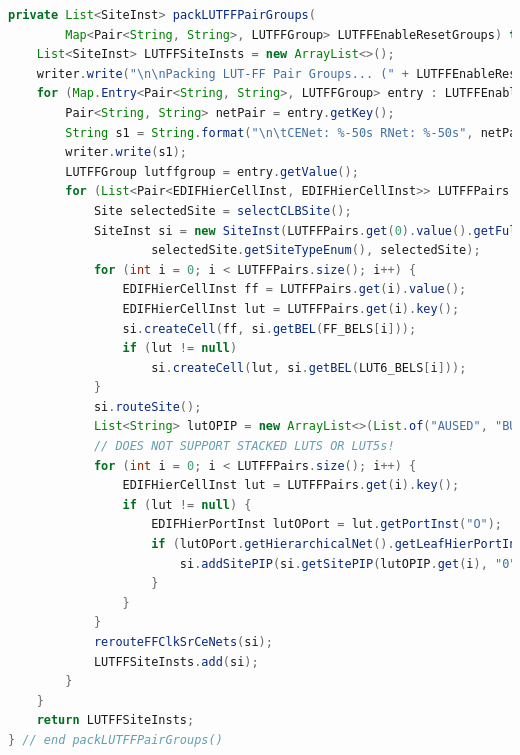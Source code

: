 \newpage
\begin{lstlisting}[language=java, caption={Packing LUTFFPairGroups into \texttt{SLICEL} \texttt{SiteInst}s}]
private List<SiteInst> packLUTFFPairGroups(
        Map<Pair<String, String>, LUTFFGroup> LUTFFEnableResetGroups) throws IOException {
    List<SiteInst> LUTFFSiteInsts = new ArrayList<>();
    writer.write("\n\nPacking LUT-FF Pair Groups... (" + LUTFFEnableResetGroups.size() + ")");
    for (Map.Entry<Pair<String, String>, LUTFFGroup> entry : LUTFFEnableResetGroups.entrySet()) {
        Pair<String, String> netPair = entry.getKey();
        String s1 = String.format("\n\tCENet: %-50s RNet: %-50s", netPair.key(), netPair.value());
        writer.write(s1);
        LUTFFGroup lutffgroup = entry.getValue();
        for (List<Pair<EDIFHierCellInst, EDIFHierCellInst>> LUTFFPairs : splitIntoGroups(lutffgroup.group(), 4)) {
            Site selectedSite = selectCLBSite();
            SiteInst si = new SiteInst(LUTFFPairs.get(0).value().getFullHierarchicalInstName(), design,
                    selectedSite.getSiteTypeEnum(), selectedSite);
            for (int i = 0; i < LUTFFPairs.size(); i++) {
                EDIFHierCellInst ff = LUTFFPairs.get(i).value();
                EDIFHierCellInst lut = LUTFFPairs.get(i).key();
                si.createCell(ff, si.getBEL(FF_BELS[i]));
                if (lut != null)
                    si.createCell(lut, si.getBEL(LUT6_BELS[i]));
            }
            si.routeSite();
            List<String> lutOPIP = new ArrayList<>(List.of("AUSED", "BUSED", "CUSED", "DUSED"));
            // DOES NOT SUPPORT STACKED LUTS OR LUT5s!
            for (int i = 0; i < LUTFFPairs.size(); i++) {
                EDIFHierCellInst lut = LUTFFPairs.get(i).key();
                if (lut != null) {
                    EDIFHierPortInst lutOPort = lut.getPortInst("O");
                    if (lutOPort.getHierarchicalNet().getLeafHierPortInsts(false, true).size() > 1) {
                        si.addSitePIP(si.getSitePIP(lutOPIP.get(i), "0"));
                    }
                }
            }
            rerouteFFClkSrCeNets(si);
            LUTFFSiteInsts.add(si);
        }
    }
    return LUTFFSiteInsts;
} // end packLUTFFPairGroups()
\end{lstlisting}


